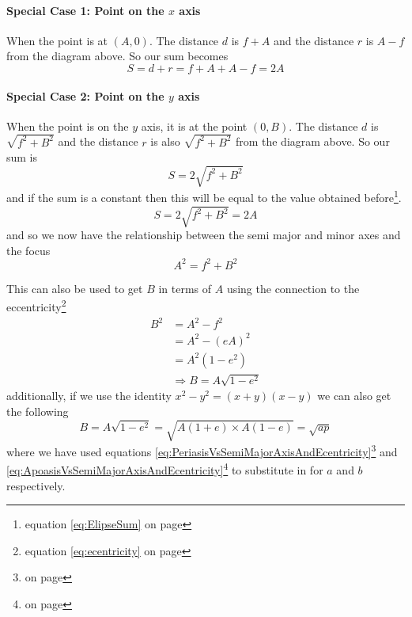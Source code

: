 \paragraph{Special Case 1: Point on the $x$ axis}
When the point is at $(A,0)$. The distance $d$ is $f+A$ and the distance $r$ is $A-f$ from the diagram above. So our sum becomes
\begin{equation}
S = d + r = f+A + A-f = 2A \label{eq:ElipseSum}
\end{equation}

\paragraph{Special Case 2: Point on the $y$ axis}

When the point is on the $y$ axis, it is at the point $(0,B)$. The distance $d$ is $\sqrt{f^2+B^2}$ and the distance $r$ is also $\sqrt{f^2+B^2}$ from the diagram above. So our sum is
\begin{equation}
S = 2 \sqrt{f^2+B^2}
\end{equation}
and if the sum is a constant then this will be equal to the value obtained before\footnote{equation \ref{eq:ElipseSum} on page \pageref{eqElipseSum}}.
\begin{equation}
S = 2 \sqrt{f^2+B^2} = 2 A
\end{equation}
and so we now have the relationship between the semi major and minor axes and the focus
\begin{equation}
 A^2=f^2+B^2
\end{equation}

This can also be used to get $B$ in terms of $A$ using the connection to the eccentricity\footnote{equation \ref{eq:ecentricity} on page \pageref{eq:ecentricity}}
\begin{align}
B^2&=A^2-f^2\nonumber \\
&=A^2-(eA)^2\nonumber \\
&=A^2(1-e^2)\nonumber \\
& \Rightarrow  B = A\sqrt{1-e^2} \label{eq:SemiMinorVsSemiMajorAndEcentricity}
\end{align}
additionally, if we use the identity $x^2-y^2=(x+y)(x-y)$ we can also get the following
\begin{equation}
 B = A\sqrt{1-e^2} = \sqrt{A(1+e)\times A(1-e)}=\sqrt{ap} \label{eq:SemiMinorVsApses}
\end{equation}
where we have used equations \ref{eq:PeriasisVsSemiMajorAxisAndEcentricity}\footnote{on page \pageref{eq:PeriasisVsSemiMajorAxisAndEcentricity}} and \ref{eq:ApoasisVsSemiMajorAxisAndEcentricity}\footnote{on page \pageref{eq:ApoasisVsSemiMajorAxisAndEcentricity}} to substitute in for $a$ and $b$ respectively.

